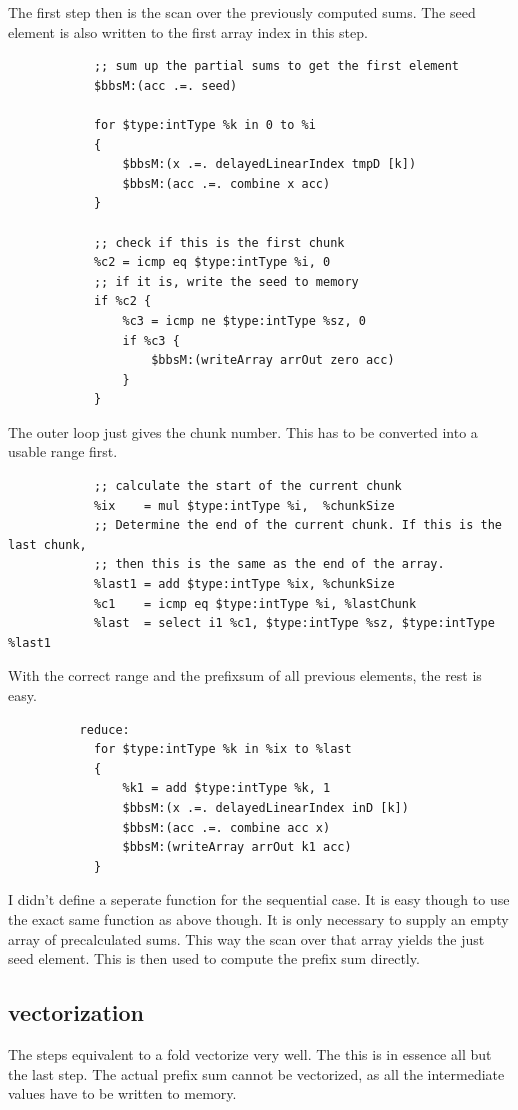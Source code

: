 \documentclass[a4paper,bibliography=totocnumbered,parskip,headsepline]{scrbook}
\begin{document}
The first step then is the scan over the previously computed sums.
The seed element is also written to the first array index in this step.
\begin{lstlisting}
            ;; sum up the partial sums to get the first element
            $bbsM:(acc .=. seed)

            for $type:intType %k in 0 to %i
            {
                $bbsM:(x .=. delayedLinearIndex tmpD [k])
                $bbsM:(acc .=. combine x acc)
            }

            ;; check if this is the first chunk
            %c2 = icmp eq $type:intType %i, 0
            ;; if it is, write the seed to memory
            if %c2 {
                %c3 = icmp ne $type:intType %sz, 0
                if %c3 {
                    $bbsM:(writeArray arrOut zero acc)
                }
            }
\end{lstlisting}
The outer loop just gives the chunk number.
This has to be converted into a usable range first.
\begin{lstlisting}
            ;; calculate the start of the current chunk
            %ix    = mul $type:intType %i,  %chunkSize
            ;; Determine the end of the current chunk. If this is the last chunk,
            ;; then this is the same as the end of the array.
            %last1 = add $type:intType %ix, %chunkSize
            %c1    = icmp eq $type:intType %i, %lastChunk
            %last  = select i1 %c1, $type:intType %sz, $type:intType %last1
\end{lstlisting}
With the correct range and the prefixsum of all previous elements, the rest is easy.
\begin{lstlisting}
          reduce:
            for $type:intType %k in %ix to %last
            {
                %k1 = add $type:intType %k, 1
                $bbsM:(x .=. delayedLinearIndex inD [k])
                $bbsM:(acc .=. combine acc x)
                $bbsM:(writeArray arrOut k1 acc)
            }
\end{lstlisting}

I didn't define a seperate function for the sequential case.
It is easy though to use the exact same function as above though.
It is only necessary to supply an empty array of precalculated sums.
This way the scan over that array yields the just seed element.
This is then used to compute the prefix sum directly.

\subsection{vectorization}
The steps equivalent to a fold vectorize very well.
The this is in essence all but the last step.
The actual prefix sum cannot be vectorized, as all the intermediate values have to be written to memory.
\end{document}

